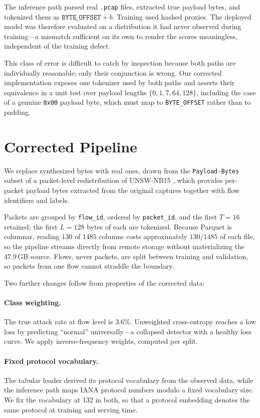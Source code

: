 \documentclass[11pt]{article}
\begin{document}
The inference path parsed real \texttt{.pcap} files, extracted true payload
bytes, and tokenized them as $\texttt{BYTE\_OFFSET} + b$. Training used hashed
proxies. The deployed model was therefore evaluated on a distribution it had
never observed during training---a mismatch sufficient on its own to render the
scores meaningless, independent of the training defect.

This class of error is difficult to catch by inspection because both paths are
individually reasonable; only their conjunction is wrong. Our corrected
implementation exposes one tokenizer used by both paths and asserts their
equivalence in a unit test over payload lengths
$\{0, 1, 7, 64, 128\}$, including the case of a genuine \texttt{0x00} payload
byte, which must map to \texttt{BYTE\_OFFSET} rather than to padding.

\section{Corrected Pipeline}
\label{sec:corrected}

We replace synthesized bytes with real ones, drawn from the \texttt{Payload-Bytes}
subset of a packet-level redistribution of UNSW-NB15
\citep{pahalavan2023nids}, which provides per-packet payload bytes extracted
from the original captures together with flow identifiers and labels.

Packets are grouped by \texttt{flow\_id}, ordered by \texttt{packet\_id}, and the
first $T = 16$ retained; the first $L = 128$ bytes of each are tokenized. Because
Parquet is columnar, reading $130$ of $1485$ columns costs approximately
$130/1485$ of each file, so the pipeline streams directly from remote storage
without materializing the 47.9\,GB source. Flows, never packets, are split
between training and validation, so packets from one flow cannot straddle the
boundary.

Two further changes follow from properties of the corrected data:

\paragraph{Class weighting.} The true attack rate at flow level is $3.6\%$.
Unweighted cross-entropy reaches a low loss by predicting ``normal''
universally---a collapsed detector with a healthy loss curve. We apply
inverse-frequency weights, computed per split.

\paragraph{Fixed protocol vocabulary.} The tabular loader derived its protocol
vocabulary from the observed data, while the inference path maps IANA protocol
numbers modulo a fixed vocabulary size. We fix the vocabulary at 132 in both, so
that a protocol embedding denotes the same protocol at training and serving time.
\end{document}
